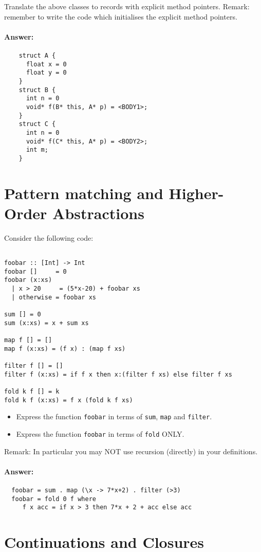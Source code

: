 \documentclass{article}
\newcommand{\answer}[0]{\paragraph{Answer:}}
\begin{document}
Translate the above classes to records with explicit method pointers.
Remark: remember to write the code which initialises the explicit
method pointers. 

\answer{
\begin{verbatim}
    struct A {
      float x = 0
      float y = 0
    }
    struct B {
      int n = 0
      void* f(B* this, A* p) = <BODY1>;
    }
    struct C {
      int n = 0
      void* f(C* this, A* p) = <BODY2>;
      int m;
    }
\end{verbatim}
}

\newpage
\section{Pattern matching and Higher-Order Abstractions}

Consider the following code:
\begin{verbatim}

foobar :: [Int] -> Int
foobar []     = 0
foobar (x:xs)
  | x > 20     = (5*x-20) + foobar xs
  | otherwise = foobar xs

sum [] = 0
sum (x:xs) = x + sum xs

map f [] = []
map f (x:xs) = (f x) : (map f xs)

filter f [] = []
filter f (x:xs) = if f x then x:(filter f xs) else filter f xs

fold k f [] = k
fold k f (x:xs) = f x (fold k f xs)
\end{verbatim}

\begin{itemize}
  \item Express the function \texttt{foobar} in terms of \texttt{sum}, \texttt{map} and \texttt{filter}.
  \item Express the function \texttt{foobar} in terms of \texttt{fold} ONLY.
\end{itemize}

Remark: In particular you may NOT use recursion (directly) in your definitions.

\answer{
  \begin{verbatim}
  foobar = sum . map (\x -> 7*x+2) . filter (>3)
  foobar = fold 0 f where
     f x acc = if x > 3 then 7*x + 2 + acc else acc
   \end{verbatim}
}
\newpage
\section{Continuations and Closures}
\end{document}
